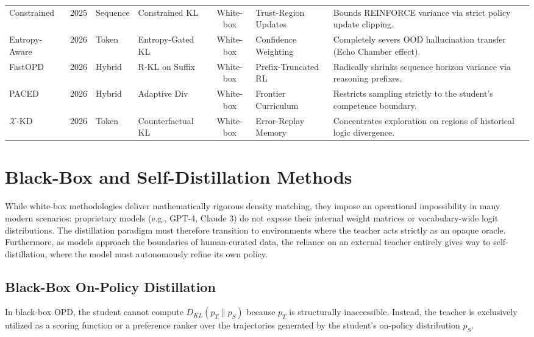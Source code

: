\documentclass{article} %
\begin{document}
\begin{table}[tbp]
{\begin{tabular}{l c l l c p{4cm} p{4.5cm}}
        Constrained \citep{2509.22921} & 2025 & Sequence & Constrained KL & White-box & Trust-Region Updates & Bounds REINFORCE variance via strict policy update clipping. \\
        Entropy-Aware \citep{2603.07079} & 2026 & Token & Entropy-Gated KL & White-box & Confidence Weighting & Completely severs OOD hallucination transfer (Echo Chamber effect). \\
        FastOPD \citep{2602.15260} & 2026 & Hybrid & R-KL on Suffix & White-box & Prefix-Truncated RL & Radically shrinks sequence horizon variance via reasoning prefixes. \\
        PACED \citep{2603.11178} & 2026 & Hybrid & Adaptive Div & White-box & Frontier Curriculum & Restricts sampling strictly to the student's competence boundary. \\
        $\mathcal{X}$-KD \citep{2602.12674} & 2026 & Token & Counterfactual KL & White-box & Error-Replay Memory & Concentrates exploration on regions of historical logic divergence. \\
        \bottomrule
    \end{tabular}
    }
\end{table}

\section{Black-Box and Self-Distillation Methods}
\label{sec:black_box}

While white-box methodologies deliver mathematically rigorous density matching, they impose an operational impossibility in many modern scenarios: proprietary models (e.g., GPT-4, Claude 3) do not expose their internal weight matrices or vocabulary-wide logit distributions. The distillation paradigm must therefore transition to environments where the teacher acts strictly as an opaque oracle. Furthermore, as models approach the boundaries of human-curated data, the reliance on an external teacher entirely gives way to self-distillation, where the model must autonomously refine its own policy.

\subsection{Black-Box On-Policy Distillation}
\label{subsec:black_box}

In black-box OPD, the student cannot compute $D_{KL}(p_T \parallel p_S)$ because $p_T$ is structurally inaccessible. Instead, the teacher is exclusively utilized as a scoring function or a preference ranker over the trajectories generated by the student's on-policy distribution $p_S$.
\end{document}
